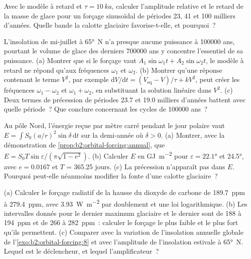 \begin{exercise}[$\star\star$]\label{exo:b2:orbital-forcing:9}
Avec le modèle à retard et $\tau = \qty{10}{ka}$, calculer l'amplitude relative et le retard de la masse de glace
pour un forçage sinusoïdal de périodes 23, 41 et \num{100} milliers d'années. Quelle bande la calotte glaciaire
favorise-t-elle, et pourquoi~?
\end{exercise}

\begin{exercise}[$\star\star\star$]\label{exo:b2:orbital-forcing:10}
L'insolation de mi-juillet à \ang{65}~N n'a presque aucune puissance à \num{100000} ans, pourtant le volume de glace
des derniers \num{700000} ans y concentre l'essentiel de sa puissance. (a) Montrer que si le forçage vaut $A_1\sin
\omega_1 t + A_2\sin\omega_2 t$, le modèle à retard ne répond qu'aux fréquences $\omega_1$ et $\omega_2$. (b) Montrer
qu'une réponse contenant le terme $V^2$, par exemple $\mathrm dV/\mathrm dt = (V_{\mathrm{eq}} -
V)/\tau + kV^2$, peut créer les fréquences $\omega_1 - \omega_2$ et $\omega_1 + \omega_2$, en
substituant la solution linéaire dans $V^2$. (c) Deux termes de précession de périodes \num{23.7} et
\num{19.0} milliers d'années battent avec quelle période~?
Que conclure concernant les cycles de \num{100000} ans~?
\end{exercise}

\begin{exercise}[$\star\star\star$]\label{exo:b2:orbital-forcing:11}
Au pôle Nord, l'énergie reçue par mètre carré pendant le jour polaire vaut $E = \int S_0(a/r)^2
\sin\delta\,\mathrm dt$ sur la demi-année où $\delta > 0$. (a) Montrer, avec la démonstration de
\cref{prop:b2:orbital-forcing:annual}, que $E = S_0T\sin\varepsilon/(\pi\sqrt{1 - e^2})$. (b) Calculer
$E$ en \unit{GJ.m^{-2}} pour $\varepsilon = \ang{22.1}$ et \ang{24.5}, avec $e = 0.0167$ et $T$ =
365.25 jours. (c) La précession n'apparaît pas dans $E$. Pourquoi peut-elle néanmoins modifier la fonte
d'une calotte glaciaire~?
\end{exercise}

\begin{exercise}[$\star\star\star$]\label{exo:b2:orbital-forcing:12}
(a) Calculer le forçage radiatif de la hausse du dioxyde de carbone de \qty{189.7}{ppm} à
\qty{279.4}{ppm}, avec \qty{3.93}{W.m^{-2}} par doublement et une loi logarithmique. (b) Les intervalles
donnés pour le dernier maximum glaciaire et le dernier  sont de 188 à \qty{194}{ppm} et de 266 à
\qty{282}{ppm}~: calculer le forçage le plus faible et le plus fort qu'ils permettent. (c) Comparer avec la variation de
l'insolation annuelle globale de l'\cref{exo:b2:orbital-forcing:8}
et avec l'amplitude de l'insolation estivale à \ang{65}~N. Lequel est le déclencheur, et lequel l'amplificateur~?
\end{exercise}

